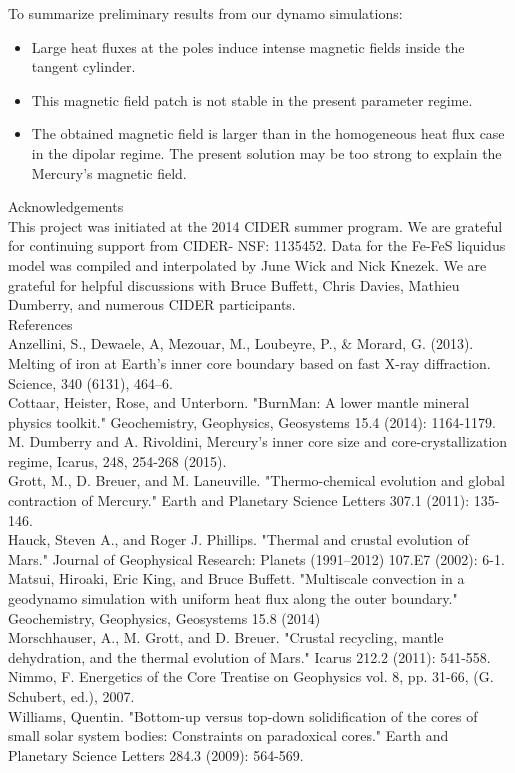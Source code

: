 \documentclass[landscape,a0b,final]{a0poster}
\begin{document}
\begin{multicols}{3}
To summarize preliminary results from our dynamo simulations:
\begin{itemize}
\item Large heat fluxes at the poles induce intense magnetic fields inside the tangent cylinder.
\item This magnetic field patch is not stable in the present parameter regime.
\item The obtained magnetic field is larger than in the homogeneous heat flux case in the dipolar regime. The present solution may be too strong to explain the Mercury's magnetic field.
\end{itemize}
\vspace{30pt}
{ \large Acknowledgements \\ \small
This project was initiated at the 2014 CIDER summer program.  We are grateful for continuing support from CIDER- NSF: 1135452.
Data for the Fe-FeS liquidus model was compiled and interpolated by June Wick and Nick Knezek.
We are grateful for helpful discussions with Bruce Buffett, Chris Davies, Mathieu Dumberry, and numerous CIDER participants.
}
\vspace{30pt}
\\
{ \large References \\ \tiny
Anzellini, S., Dewaele, A, Mezouar, M., Loubeyre, P., \& Morard, G. (2013). Melting of
iron at Earth's inner core boundary based on fast X-ray diffraction. Science,
340 (6131), 464–6.\\
Cottaar, Heister, Rose, and Unterborn. "BurnMan: A lower mantle mineral physics toolkit." Geochemistry, Geophysics, Geosystems 15.4 (2014): 1164-1179. \\
M. Dumberry and A. Rivoldini, Mercury's inner core size and core-crystallization regime, Icarus, 248, 254-268 (2015). \\
Grott, M., D. Breuer, and M. Laneuville. "Thermo-chemical evolution and global contraction of Mercury." Earth and Planetary Science Letters 307.1 (2011): 135-146. \\
Hauck, Steven A., and Roger J. Phillips. "Thermal and crustal evolution of Mars." Journal of Geophysical Research: Planets (1991–2012) 107.E7 (2002): 6-1. \\
Matsui, Hiroaki, Eric King, and Bruce Buffett. "Multiscale convection in a geodynamo simulation with uniform heat flux along the outer boundary." Geochemistry, Geophysics, Geosystems 15.8 (2014) \\
Morschhauser, A., M. Grott, and D. Breuer. "Crustal recycling, mantle dehydration,
and the thermal evolution of Mars." Icarus 212.2 (2011): 541-558. \\
Nimmo, F. Energetics of the Core Treatise on Geophysics vol. 8, pp. 31-66, (G.
Schubert, ed.), 2007. \\
Williams, Quentin. "Bottom-up versus top-down solidification of the cores of small solar system bodies: Constraints on paradoxical cores." Earth and Planetary Science Letters 284.3 (2009): 564-569.
 }

\end{multicols}
\end{document}

